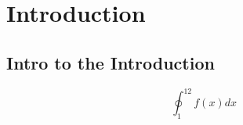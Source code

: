 \documentclass[12pt]{article}
\title{\titleVar}
\date{\today}
\author{\authorVar}
\newcommand{\tocr}{
\renewcommand\cftaftertoctitle{\par\noindent\hrulefill\par\vskip-0.65em}
\tableofcontents
\noindent\hrulefill
}
\begin{document}
    
    
\maketitle

\tocr

\thispagestyle{fancy}

\section{Introduction}
\subsection{Intro to the Introduction}
\lipsum[10]
$$ \oint _ 1 ^12 f(x) dx $$
\lipsum[2]

    
\end{document}
